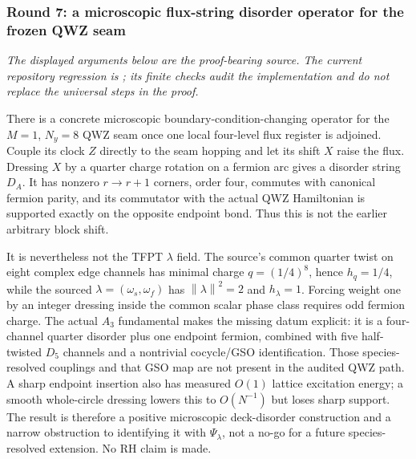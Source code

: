 \subsubsection*{Round 7: a microscopic flux-string disorder operator for the frozen QWZ seam}
\label{sec:toe-r7-charged}
\noindent\emph{The displayed arguments below are the proof-bearing source.  The current
repository regression is ; its finite checks audit the
implementation and do not replace the universal steps in the proof.}

\begingroup
\def\Hh{\mathcal H}
\def\F{\mathcal F}
\def\C{\mathbb C}
\def\Z{\mathbb Z}
\def\id{\mathbf 1}
\def\norm#1{\left\lVert #1\right\rVert}
\begin{keybox}
There is a concrete microscopic boundary-condition-changing operator for the
$M=1$, $N_y=8$ QWZ seam once one local four-level flux register is adjoined.
Couple its clock $Z$ directly to the seam hopping and let its shift $X$ raise
the flux.  Dressing $X$ by a quarter charge rotation on a fermion arc gives a
disorder string $D_A$.  It has nonzero $r\to r+1$ corners, order four, commutes
with canonical fermion parity, and its commutator with the actual QWZ
Hamiltonian is supported exactly on the opposite endpoint bond.  Thus this is
not the earlier arbitrary block shift.

It is nevertheless not the TFPT $\lambda$ field.  The source's common quarter
twist on eight complex edge channels has minimal charge $q=(1/4)^8$, hence
$h_q=1/4$, while the sourced $\lambda=(\omega_s,\omega_f)$ has
$\norm{\lambda}^2=2$ and $h_\lambda=1$.  Forcing weight one by an integer
dressing inside the common scalar phase class requires odd fermion charge.
The actual $A_3$ fundamental makes the missing datum explicit: it is a
four-channel quarter disorder plus one endpoint fermion, combined with five
half-twisted $D_5$ channels and a nontrivial cocycle/GSO identification.
Those species-resolved couplings and that GSO map are not present in the
audited QWZ path.  A sharp endpoint insertion also has measured $O(1)$ lattice
excitation energy; a smooth whole-circle dressing lowers this to $O(N^{-1})$
but loses sharp support.  The result is therefore a positive microscopic
deck-disorder construction and a narrow obstruction to identifying it with
$\Psi_\lambda$, not a no-go for a future species-resolved extension.  No RH
claim is made.
\end{keybox}

